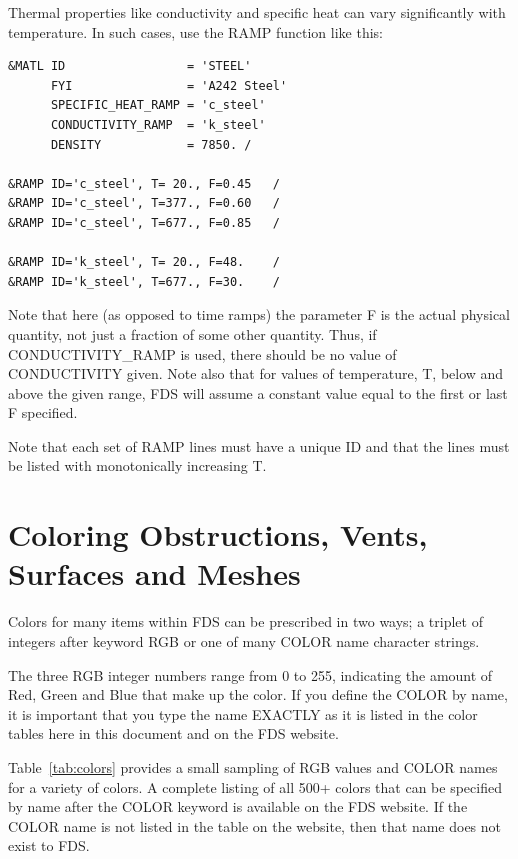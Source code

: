 \documentclass[11pt]{book}
\begin{document}
Thermal properties like conductivity and specific heat can vary significantly with temperature. In such cases, use
the {\ct RAMP} function like this:

\footnotesize
\begin{verbatim}
&MATL ID                 = 'STEEL'
      FYI                = 'A242 Steel'
      SPECIFIC_HEAT_RAMP = 'c_steel'
      CONDUCTIVITY_RAMP  = 'k_steel'
      DENSITY            = 7850. /

&RAMP ID='c_steel', T= 20., F=0.45   /
&RAMP ID='c_steel', T=377., F=0.60   /
&RAMP ID='c_steel', T=677., F=0.85   /

&RAMP ID='k_steel', T= 20., F=48.    /
&RAMP ID='k_steel', T=677., F=30.    /
\end{verbatim}
\normalsize

\noindent
Note that here (as opposed to time ramps) the parameter {\ct F} is the actual physical quantity, not just
a fraction of some other quantity. Thus, if {\ct CONDUCTIVITY\_RAMP} is used, there should be no
value of {\ct CONDUCTIVITY} given. Note also that for values of temperature, {\ct T}, below and above the
given range, FDS will assume a constant value equal to the first or last {\ct F} specified.

\begin{warning}
\noindent
Note that each set of {\ct RAMP} lines must have a unique {\ct ID} and that the lines must
be listed with monotonically increasing {\ct T}.
\end{warning}




\section{Coloring Obstructions, Vents, Surfaces and Meshes}
\label{info:colors}

Colors for many items within FDS can be prescribed in two ways; a triplet of
integers after keyword {\ct RGB} or one of many {\ct COLOR} name character strings.

The three {\ct RGB} integer numbers range from 0 to 255, indicating the amount of Red, Green and Blue
that make up the color. If you define the {\ct COLOR} by name, it is important that you type the name EXACTLY as it
is listed in the color tables here in this document and on the FDS website.

Table~\ref{tab:colors} provides a small sampling of {\ct RGB} values and {\ct COLOR} names
for a variety of colors. A complete listing of all 500+ colors that can be
specified by name after the {\ct COLOR} keyword is available on the FDS website.
If the {\ct COLOR} name is not listed in the table on the website, then that name does not exist to FDS.
\end{document}
